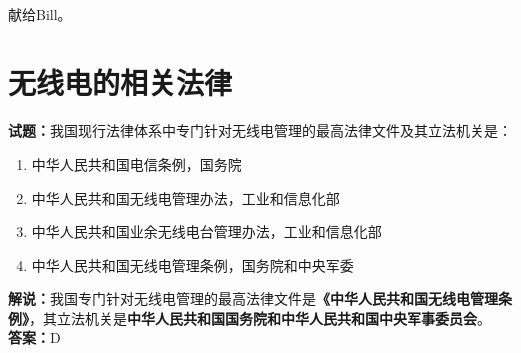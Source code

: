 \documentclass{ctexbook}
\newcommand{\commit}{\dots~(in \emph{packed-refs})}}
\begin{document}

\title{}
\author{\large \texttt{BG7XTQ}（原\texttt{JJ1DSB}）编著}
\date{\large{日期：\texttt{\today}}
  \\版本：\texttt{\commit}在\texttt{\branch}分支上
  \vspace{\baselineskip}
  \\使用  编译
  \\使用了 \Morsesym 包
}

\maketitle

\thispagestyle{empty}
\vfil
\ \\
\vspace{15em}
\begin{center}
  {\Large 献给Bill。}
\end{center}

\newpage

\tableofcontents%





\chapter{无线电的相关法律}

\newpage

\noindent\textbf{试题：}我国现行法律体系中专门针对无线电管理的最高法律文件及其立法机关是：
\begin{enumerate}[leftmargin=3em]
  \item 中华人民共和国电信条例，国务院
  \item 中华人民共和国无线电管理办法，工业和信息化部
  \item 中华人民共和国业余无线电台管理办法，工业和信息化部
  \item 中华人民共和国无线电管理条例，国务院和中央军委
\end{enumerate}
\noindent\textbf{解说：}我国专门针对无线电管理的最高法律文件是\textbf{《中华人民共和国无线电管理条例》}，其立法机关是\textbf{中华人民共和国国务院和中华人民共和国中央军事委员会}。\\\noindent\textbf{答案：}D

\vspace{\baselineskip}
\end{document}
